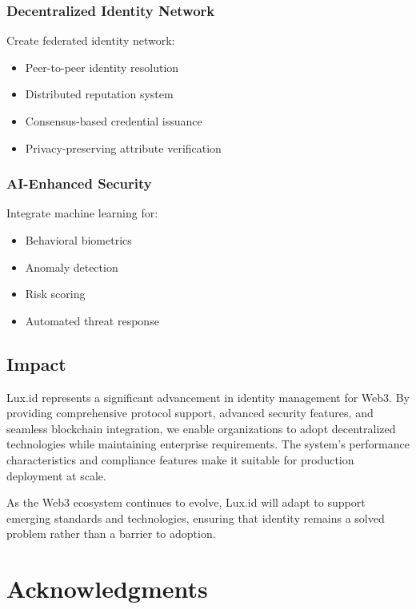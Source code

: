 \documentclass[11pt,a4paper]{article}
\begin{document}
\subsubsection{Decentralized Identity Network}

Create federated identity network:
\begin{itemize}
    \item Peer-to-peer identity resolution
    \item Distributed reputation system
    \item Consensus-based credential issuance
    \item Privacy-preserving attribute verification
\end{itemize}

\subsubsection{AI-Enhanced Security}

Integrate machine learning for:
\begin{itemize}
    \item Behavioral biometrics
    \item Anomaly detection
    \item Risk scoring
    \item Automated threat response
\end{itemize}

\subsection{Impact}

Lux.id represents a significant advancement in identity management for Web3. By providing comprehensive protocol support, advanced security features, and seamless blockchain integration, we enable organizations to adopt decentralized technologies while maintaining enterprise requirements. The system's performance characteristics and compliance features make it suitable for production deployment at scale.

As the Web3 ecosystem continues to evolve, Lux.id will adapt to support emerging standards and technologies, ensuring that identity remains a solved problem rather than a barrier to adoption.

\section*{Acknowledgments}
\end{document}
